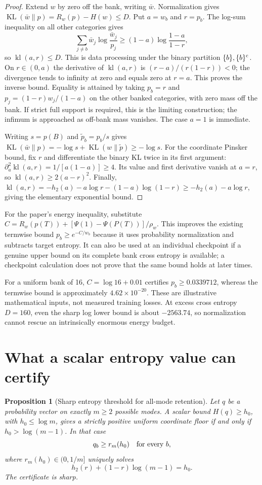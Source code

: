 \documentclass[11pt]{article}
\newtheorem{proposition}{Proposition}
\DeclareMathOperator{\KL}{KL}
\DeclareMathOperator{\kl}{kl}
\begin{document}
\begin{proof}
Extend $w$ by zero off the bank, writing $\bar w$. Normalization gives
$\KL(\bar w\|p)=R_w(p)-H(w)\le D$.
Put $a=w_b$ and $r=p_b$. The log-sum inequality on all other categories gives
\[
 \sum_{j\ne b}\bar w_j\log\frac{\bar w_j}{p_j}
 \ge(1-a)\log\frac{1-a}{1-r},
\]
so $\kl(a,r)\le D$. This is data processing under the binary partition
$\{b\},\{b\}^{\rm c}$. On $r\in(0,a)$ the derivative of $\kl(a,r)$ is
$(r-a)/(r(1-r))<0$; the divergence tends to infinity at zero and equals zero
at $r=a$. This proves the inverse bound. Equality is attained by taking
$p_b=r$ and $p_j=(1-r)w_j/(1-a)$ on the other banked categories, with zero
mass off the bank. If strict full support is required, this is the limiting
construction; the infimum is approached as off-bank mass vanishes. The case
$a=1$ is immediate.

Writing $s=p(B)$ and $\widetilde p_b=p_b/s$ gives
$\KL(\bar w\|p)=-\log s+\KL(w\|\widetilde p)\ge-\log s$.
For the coordinate Pinsker bound, fix $r$ and differentiate the binary
KL twice in its first argument: $\partial_a^2\kl(a,r)=1/[a(1-a)]\ge4$.
Its value and first derivative vanish at $a=r$, so
$\kl(a,r)\ge2(a-r)^2$. Finally,
$\kl(a,r)=-h_2(a)-a\log r-(1-a)\log(1-r)
\ge-h_2(a)-a\log r$, giving the elementary exponential bound.
\end{proof}

For the paper's energy inequality, substitute
$C=R_w(p(T))+[\Psi(1)-\Psi(P(T))]/\rho_w$.
This improves the existing termwise bound $p_b\ge e^{-C/w_b}$ because it
uses probability normalization and subtracts target entropy. It can also be
used at an individual checkpoint if a genuine upper bound on its complete
bank cross entropy is available; a checkpoint calculation does not prove
that the same bound holds at later times.

For a uniform bank of 16, $C=\log16+0.01$ certifies
$p_b\ge0.0339712$, whereas the termwise bound is approximately
$4.62\times10^{-20}$. These are illustrative mathematical inputs, not
measured training losses. At excess cross entropy $D=160$, even the sharp
log lower bound is about $-2563.74$, so normalization cannot rescue an
intrinsically enormous energy budget.

\section{What a scalar entropy value can certify}
\begin{proposition}[Sharp entropy threshold for all-mode retention]
Let $q$ be a probability vector on exactly $m\ge2$ possible modes. A scalar
bound $H(q)\ge h_0$, with $h_0\le\log m$, gives a strictly positive uniform
coordinate floor if and only if $h_0>\log(m-1)$. In that case
\[
 q_b\ge r_m(h_0)\quad\hbox{for every }b,
\]
where $r_m(h_0)\in(0,1/m]$ uniquely solves
\[
 h_2(r)+(1-r)\log(m-1)=h_0.
\]
The certificate is sharp.
\end{proposition}
\end{document}
